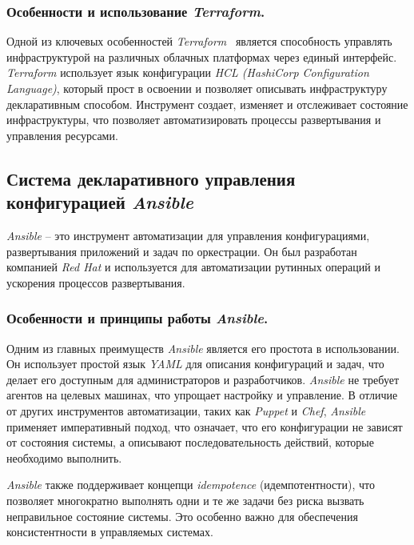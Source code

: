\subsubsection{Особенности и использование \textit{Terraform}.}
Одной из ключевых особенностей \textit{Terraform}~\cite{terraform} является способность управлять инфраструктурой на различных облачных платформах через единый интерфейс. \textit{Terraform} использует язык конфигурации \textit{HCL (HashiCorp Configuration Language)}, который прост в освоении и позволяет описывать инфраструктуру декларативным способом. Инструмент создает, изменяет и отслеживает состояние инфраструктуры, что позволяет автоматизировать процессы развертывания и управления ресурсами.
\subsection{Система декларативного управления конфигурацией \textit{Ansible}}
\label{sec:ansible}
\textit{Ansible} -- это инструмент автоматизации для управления конфигурациями, развертывания приложений и задач по оркестрации. Он был разработан компанией \textit{Red Hat} и используется для автоматизации рутинных операций и ускорения процессов развертывания.

\subsubsection{Особенности и принципы работы \textit{Ansible}.}
Одним из главных преимуществ \textit{Ansible} является его простота в использовании. Он использует простой язык \textit{YAML} для описания конфигураций и задач, что делает его доступным для администраторов и разработчиков. \textit{Ansible} не требует агентов на целевых машинах, что упрощает настройку и управление. В отличие от других инструментов автоматизации, таких как \textit{Puppet} и \textit{Chef}, \textit{Ansible} применяет императивный подход, что означает, что его конфигурации не зависят от состояния системы, а описывают последовательность действий, которые необходимо выполнить. 

\textit{Ansible} также поддерживает концепци \textit{idempotence} (идемпотентности), что позволяет многократно выполнять одни и те же задачи без риска вызвать неправильное состояние системы. Это особенно важно для обеспечения консистентности в управляемых системах.

